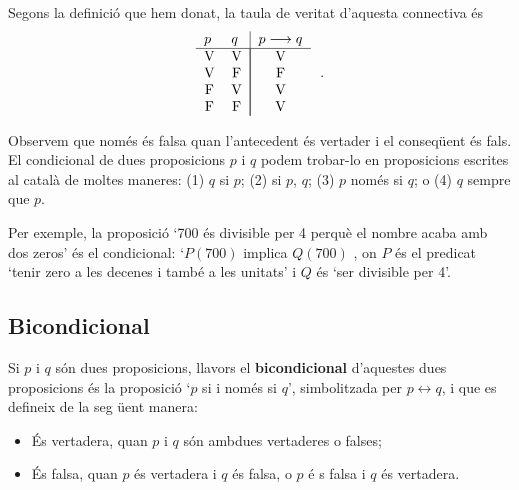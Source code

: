 Segons la definici\'{o} que hem donat, la taula de veritat d'aquesta
connectiva \'{e}s%
\begin{equation*}
\begin{tabular}{ll|l}
$p$ & $q$ & $p\longrightarrow q$ \\ \hline
\multicolumn{1}{c}{V} & \multicolumn{1}{c|}{V} & \multicolumn{1}{|c}{V} \\
\multicolumn{1}{c}{V} & \multicolumn{1}{c|}{F} & \multicolumn{1}{|c}{F} \\
\multicolumn{1}{c}{F} & \multicolumn{1}{c|}{V} & \multicolumn{1}{|c}{V} \\
\multicolumn{1}{c}{F} & \multicolumn{1}{c|}{F} & \multicolumn{1}{|c}{V}%
\end{tabular}
\text{.}
\end{equation*}

Observem que nom\'{e}s \'{e}s falsa quan l'antecedent \'{e}s vertader i el
conseq\"{u}ent \'{e}s fals. El condicional de dues proposicions $p$ i $q$
podem trobar-lo en proposicions escrites al catal\`{a} de moltes maneres:
(1) $q$ si $p$; (2) si $p$, $q$; (3) $p$ nom\'{e}s si $q$; o (4) $q$ sempre
que $p$.

Per exemple, la proposici\'{o} `700 \'{e}s divisible per 4 perqu\`{e} el
nombre acaba amb dos zeros' \'{e}s el condicional: `$P(700)$ implica $Q(700)$%
, on $P$ \'{e}s el predicat `tenir zero a les decenes i tamb\'{e} a les
unitats' i $Q$ \'{e}s `ser divisible per 4'.

\subsection{Bicondicional}

Si $p$ i $q$ s\'{o}n dues proposicions, llavors el \textbf{bicondicional}
d'aquestes dues proposicions \'{e}s la proposici\'{o} `$p$ si i nom\'{e}s si
$q$', simbolitzada per $p\longleftrightarrow q$, i que es defineix de la seg%
\"{u}ent manera:

\begin{itemize}
\item \'{E}s vertadera, quan $p$ i $q$ s\'{o}n ambdues vertaderes o falses;

\item \'{E}s falsa, quan $p$ \'{e}s vertadera i $q$ \'{e}s falsa, o $p$ \'{e}%
s falsa i $q$ \'{e}s vertadera.
\end{itemize}

